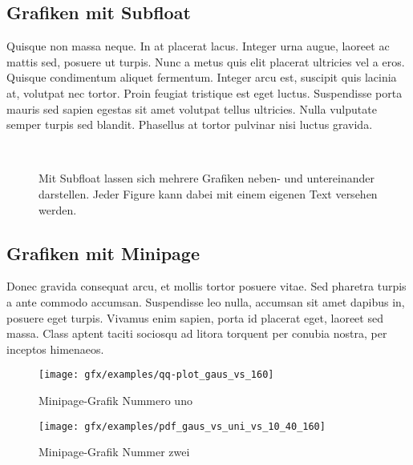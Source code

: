 \subsection{Grafiken mit Subfloat}\label{ssec:grafiken-mit-subfloat}
Quisque non massa neque. In at placerat lacus. Integer urna augue, laoreet ac mattis sed, posuere ut turpis. Nunc a metus quis elit placerat ultricies vel a eros. Quisque condimentum aliquet fermentum. Integer arcu est, suscipit quis lacinia at, volutpat nec tortor. Proin feugiat tristique est eget luctus. Suspendisse porta mauris sed sapien egestas sit amet volutpat tellus ultricies. Nulla vulputate semper turpis sed blandit. Phasellus at tortor pulvinar nisi luctus gravida.

\begin{figure}[bth]
  \myfloatalign
   \quad
    \\
    \quad
   \caption[Subfloat - Figure]{Mit Subfloat lassen sich mehrere Grafiken neben- und untereinander darstellen. Jeder Figure kann dabei mit einem eigenen Text versehen werden.}
   \label{fig:chapter03:subfloat}
\end{figure}


\subsection{Grafiken mit Minipage}\label{ssec:grafiken-mit-minipage}
Donec gravida consequat arcu, et mollis tortor posuere vitae. Sed pharetra turpis a ante commodo accumsan. Suspendisse leo nulla, accumsan sit amet dapibus in, posuere eget turpis. Vivamus enim sapien, porta id placerat eget, laoreet sed massa. Class aptent taciti sociosqu ad litora torquent per conubia nostra, per inceptos himenaeos.

\begin{figure}[htbp]
  \centering
  \begin{minipage}[b]{5 cm}
    \texttt{[image: gfx/examples/qq-plot\_gaus\_vs\_160]}
    \caption{Minipage-Grafik Nummero uno}
    \label{fig:chapter03:minipage:grafik1}
  \end{minipage}
  \begin{minipage}[b]{5 cm}
    \texttt{[image: gfx/examples/pdf\_gaus\_vs\_uni\_vs\_10\_40\_160]}
    \caption{Minipage-Grafik Nummer zwei}
    \label{fig:chapter03:minipage:grafik2}
  \end{minipage}
\end{figure}

